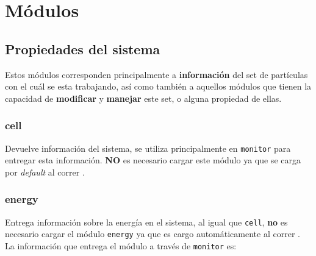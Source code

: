 \chapter{M\'odulos}
\label{chap:modulos}

\section{Propiedades del sistema}
Estos m\'odulos corresponden principalmente a \textbf{informaci\'on} del set de part\'iculas con el cu\'al se esta trabajando, as\'i como tambi\'en a aquellos m\'odulos que tienen la capacidad de \textbf{modificar} y \textbf{manejar} este set, o alguna propiedad de ellas.
\subsection{cell}
Devuelve informaci\'on del sistema, se utiliza principalmente en \verb|monitor| para entregar esta informaci\'on. \textbf{NO} es necesario cargar este m\'odulo ya que se carga por \textit{default} al correr {\lpmd}.


\subsection{energy}
Entrega informaci\'on sobre la energ\'ia en el sistema, al igual que \verb|cell|, \textbf{no} es necesario cargar el m\'odulo \verb|energy| ya que es cargo autom\'aticamente al correr {\lpmd}. La informaci\'on que entrega el m\'odulo a trav\'es de \verb|monitor| es:


